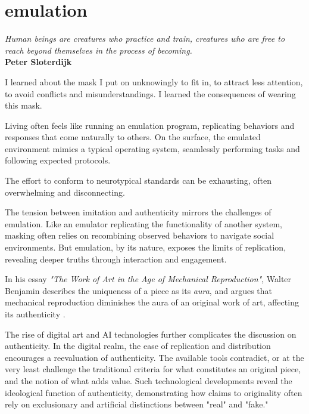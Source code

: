 \chapter*{emulation}
\begin{center}
\vspace{2cm}
\begin{flushright}
\large
\textit{Human beings are creatures who practice and train, creatures who are free to reach beyond themselves in the process of becoming.}\\
\textbf{Peter Sloterdijk} \citep{sloterdijk2014}
\end{flushright}
\vspace{2cm}
\end{center}
\normalsize

\newpage  
I learned about the mask I put on unknowingly to fit in, to attract less attention, to avoid conflicts and misunderstandings. I learned the consequences of wearing this mask.

Living often feels like running an emulation program, replicating behaviors and responses that come naturally to others. On the surface, the emulated environment mimics a typical operating system, seamlessly performing tasks and following expected protocols. 

The effort to conform to neurotypical standards can be exhausting, often overwhelming and disconnecting.

The tension between imitation and authenticity mirrors the challenges of emulation. Like an emulator replicating the functionality of another system, masking often relies on recombining observed behaviors to navigate social environments. But emulation, by its nature, exposes the limits of replication, revealing deeper truths through interaction and engagement.

In his essay \textit{"The Work of Art in the Age of Mechanical Reproduction"}, Walter Benjamin describes the uniqueness of a piece as its \textit{aura}, and argues that mechanical reproduction diminishes the aura of an original work of art, affecting its authenticity \citep{benjamin1935}. 

The rise of digital art and AI technologies further complicates the discussion on authenticity. In the digital realm, the ease of replication and distribution encourages a reevaluation of authenticity. The available tools contradict, or at the very least challenge the traditional criteria for what constitutes an original piece, and the notion of what adds value. Such technological developments reveal the ideological function of authenticity, demonstrating how claims to originality often rely on exclusionary and artificial distinctions between "real" and "fake."

